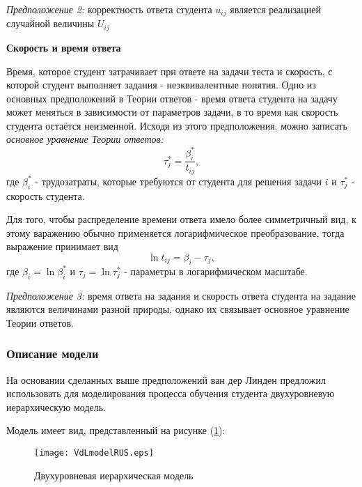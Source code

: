 {\itshape Предположение 2:} корректность ответа студента $u_{ij}$ является реализацией случайной величины $U_{ij}$

{\bfseries Скорость и время ответа}

Время, которое студент затрачивает при ответе на задачи теста и  скорость, с которой студент выполняет задания - неэквивалентные понятия. Одно из основных предположений в  Теории ответов - время ответа студента на задачу может меняться в зависимости от параметров задачи, в то время как скорость студента остаётся неизменной. Исходя из этого предположения, можно за\-писать {\itshape основное уравнение Теории ответов:}
\begin{equation}
\tau_{j}^{*} = \frac{\beta^{*}_{i}}{t_{ij}},
\end{equation}
где $\beta^{*}_{i}$ - трудозатраты, которые требуются от студента для решения задачи $i$ и $\tau_{j}^{*}$ - скорость студента.

Для того, чтобы распределение времени ответа имело более симметричный вид, к этому варажению обычно применяется лога\-рифмическое преобразо\-вание, тогда выражение при\-нимает вид
\begin{equation}
\ln {t_{ij}} = \beta_{i} - \tau_{j},
\end{equation}
где $\beta_{i} = \ln \beta^{*}_{i}$ и $\tau_{j} = \ln \tau^{*}_{j}$ - параметры в логарифмическом масштабе.

{\itshape Предположение 3:} время ответа на задания и скорость ответа студента на задание являются величинами разной природы, однако их связывает основное уравнение Теории ответов.

\subsubsection{Описание модели}

\label{detmodel} 

На основании сделанных выше предположений ван дер Линден пред\-ложил использовать для моделирования процесса обучения студента двух\-уровневую иерархическую модель\cite{8.}. 

\newpage
Модель имеет вид, представленный на рисунке (\ref{2levelfrwork}):


\begin{figure}[ht!]
\centering \texttt{[image: VdLmodelRUS.eps]}
\caption{Двухуровневая иерархическая модель}
\label{2levelfrwork}
\end{figure}

